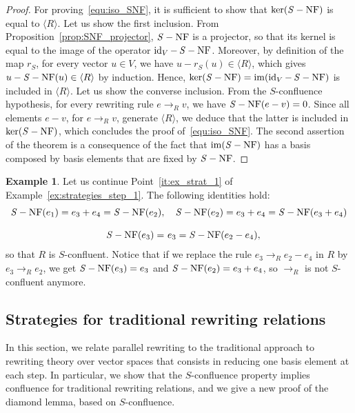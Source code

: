 \documentclass[11pt]{article}
\theoremstyle{definition}
\newtheorem{example}[theorem]{Example}
\DeclareMathOperator{\id}{id}
\newcommand\Span[1]{\langle #1\rangle}
\DeclareMathOperator{\im}{im}
\newcommand\rewR{\to_R}
\DeclareMathOperator{\SNF}{{\it S}-NF}
\begin{document}
\begin{proof}
  For proving~\eqref{equ:iso_SNF}, it is sufficient to show that
  $\ker(\SNF)$ is equal to $\Span{R}$. Let us show the first inclusion.
  From Proposition~\ref{prop:SNF_projector}, $\SNF$ is a projector, so
  that its kernel is equal to the image of the operator $\id_V-\SNF$.
  Moreover, by definition of the map $r_S$, for every vector $u\in V$, we
  have $u-r_S(u)\in\Span{R}$, which gives $u-\SNF(u)\in\Span{R}$ by
  induction. Hence, $\ker(\SNF)=\im(\id_V-\SNF)$ is included in
  $\Span{R}$. Let us show the converse inclusion. From the $S$-confluence
  hypothesis, for every rewriting rule $e\rewR v$, we have $\SNF(e-v)=0$. 
  Since all elements $e-v$, for $e\rewR v$, generate $\Span{R}$, we 
  deduce that the latter is included in $\ker(\SNF)$, which concludes the
  proof of~\eqref{equ:iso_SNF}. The second assertion of the theorem is a
  consequence of the fact that $\im(\SNF)$ has a basis composed by basis
  elements that are fixed by $\SNF$.
\end{proof}
\smallskip

\begin{example}\label{ex:S-conf}
  Let us continue Point~\ref{it:ex_strat_1} of
  Example~\ref{ex:strategies_step_1}. The following identities hold:
  \[\begin{split}
  \SNF(e_1)=e_3+e_4=\SNF(e_2),&\quad\SNF(e_2)=e_3+e_4=\SNF(e_3+e_4)
  \\[0.3cm]
  \SNF(e_3)=& \ e_3=\SNF(e_2-e_4),
  \end{split}
  \smallskip\]
  so that $R$ is $S$-confluent. Notice that if we replace the rule
  $e_3\rewR e_2-e_4$ in $R$ by $e_3\rewR e_2$, we get $\SNF(e_3)=e_3$ and
  $\SNF(e_2)=e_3+e_4$, so $\rewR$ is not $S$-confluent anymore. 
\end{example}

\subsection{Strategies for traditional rewriting relations}
\label{sec:strategies_for_traditional_rewriting_relations}

In this section, we relate parallel rewriting to the traditional approach
to rewriting theory over vector spaces that consists in reducing one
basis element at each step. In particular, we show that the
$S$-confluence property implies confluence for traditional rewriting
relations, and we give a new proof of the diamond lemma, based on
$S$-confluence.
\medskip
\end{document}
